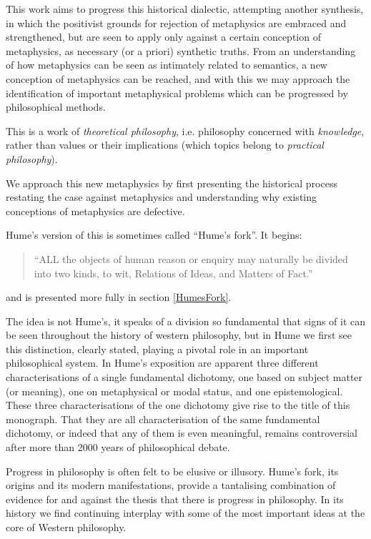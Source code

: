 This work aims to progress this historical dialectic, attempting another synthesis, in which the positivist grounds for rejection of metaphysics are embraced and strengthened, but are seen to apply only against a certain conception of metaphysics, as necessary (or a priori) synthetic truths.
From an understanding of how metaphysics can be seen as intimately related to semantics, a new conception of metaphysics can be reached, and with this we may approach the identification of important metaphysical problems  which can be progressed by philosophical methods.

This is a work of {\it theoretical philosophy}, i.e. philosophy concerned with {\it knowledge}, rather than values or their implications (which topics belong to {\it practical philosophy}).

We approach this new metaphysics by first presenting the historical process restating the case against metaphysics and understanding why existing conceptions of metaphysics are defective.

Hume's version of this is sometimes called ``Hume's fork''.
It begins:

\begin{quote}
``ALL the objects of human reason or enquiry may naturally be divided into two kinds, to wit, Relations of Ideas, and Matters of Fact.''
\end{quote}

and is presented more fully in section \ref{HumesFork}.

The idea is not Hume's, it speaks of a division so fundamental that signs of it can be seen throughout the history of western philosophy, but in Hume we first see this distinction, clearly stated, playing a pivotal role in an important philosophical system.
In Hume's exposition are apparent three different characterisations of a single fundamental dichotomy, one based on subject matter (or meaning), one on metaphysical or modal status, and one epistemological.
These three characterisations of the one dichotomy give rise to the title of this monograph.
That they are all characterisation of the same fundamental dichotomy, or indeed that any of them is even meaningful, remains controversial after more than 2000 years of philosophical debate. 

Progress in philosophy is often felt to be elusive or illusory.
Hume's fork, its origins and its modern manifestations, provide a tantalising combination of evidence for and against the thesis that there is progress in philosophy.
In its history we find continuing interplay with some of the most important ideas at the core of Western philosophy.
